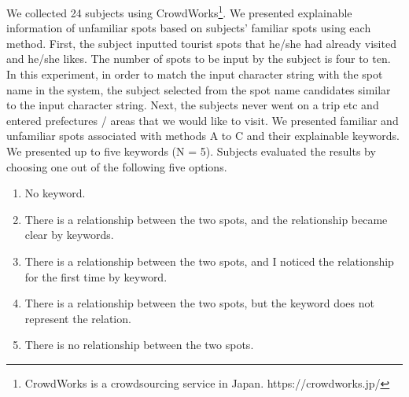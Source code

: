 \documentclass[journal]{IAENGtran}
\begin{document}
We collected 24 subjects using CrowdWorks\footnote{CrowdWorks is a crowdsourcing service in Japan. https://crowdworks.jp/}.
We presented explainable information of unfamiliar spots based on subjects' familiar spots using each method.
First, the subject inputted tourist spots that he/she had already visited and he/she likes.
The number of spots to be input by the subject is four to ten.
In this experiment, in order to match the input character string with the spot name in the system, the subject selected from the spot name candidates similar to the input character string.
Next, the subjects never went on a trip etc and entered prefectures / areas that we would like to visit.
We presented familiar and unfamiliar spots associated with methods A to C and their explainable keywords.
We presented up to five keywords (N = 5).
Subjects evaluated the results by choosing one out of the following five options.
\begin{enumerate}
  \item No keyword.
  \item There is a relationship between the two spots, and the relationship became clear by keywords.
  \item There is a relationship between the two spots, and I noticed the relationship for the first time by keyword.
  \item There is a relationship between the two spots, but the keyword does not represent the relation.
  \item There is no relationship between the two spots.
\end{enumerate}

\end{document}
